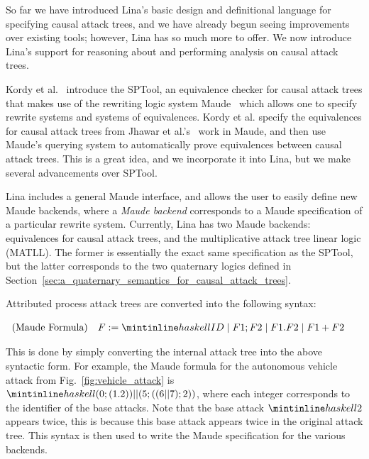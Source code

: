\documentclass{llncs}
\begin{document}
So far we have introduced Lina's basic design and definitional
language for specifying causal attack trees, and we have already begun
seeing improvements over existing tools; however, Lina has so much
more to offer.  We now introduce Lina's support for reasoning about
and performing analysis on causal attack trees.

Kordy et al.~\cite{Kordy2017} introduce the SPTool, an equivalence
checker for causal attack trees that makes use of the rewriting logic
system Maude~\cite{clavel2005maude} which allows one to specify
rewrite systems and systems of equivalences.  Kordy et al. specify the
equivalences for causal attack trees from Jhawar et
al.'s~\cite{Jhawar:2015} work in Maude, and then use Maude's querying
system to automatically prove equivalences between causal attack
trees.  This is a great idea, and we incorporate it into Lina, but we
make several advancements over SPTool.

Lina includes a general Maude interface, and allows the user to easily
define new Maude backends, where a \emph{Maude backend} corresponds to
a Maude specification of a particular rewrite system.  Currently, Lina
has two Maude backends: equivalences for causal attack trees, and the
multiplicative attack tree linear logic (MATLL).  The former is
essentially the exact same specification as the SPTool, but the latter
corresponds to the two quaternary logics defined in
Section~\ref{sec:a_quaternary_semantics_for_causal_attack_trees}.

Attributed process attack trees are converted into the following
syntax:
\begin{center}
  \begin{math}
    \begin{array}{lll}
      \text{(Maude Formula)} & F := \mh{ID} \mid F1 ; F2 \mid F1.F2 \mid F1+F2
    \end{array}
  \end{math}
\end{center}
This is done by simply converting the internal attack tree into the
above syntactic form.  For example, the Maude formula for the
autonomous vehicle attack from Fig.~\ref{fig:vehicle_attack} is
$\mh{(0 ; (1 . 2)) || (5 ; ((6 || 7) ; 2))}$, where each integer
corresponds to the identifier of the base attacks.  Note that the base
attack $\mh{2}$ appears twice, this is because this base attack
appears twice in the original attack tree.  This syntax is then used
to write the Maude specification for the various backends.
\end{document}
